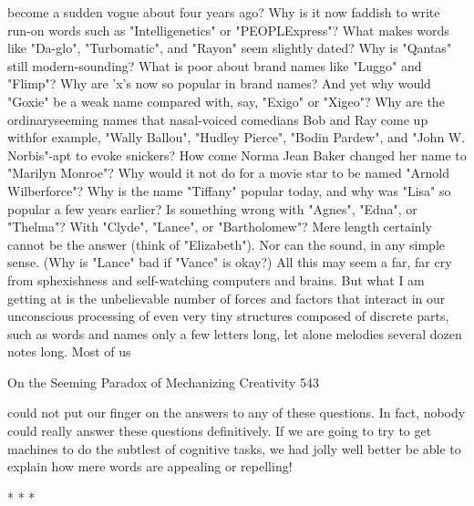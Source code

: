 become a sudden vogue about four years ago?
        Why is it now faddish to write run-on words such as "Intelligenetics" or
"PEOPLExpress"? What makes words like "Da-glo", "Turbomatic", and "Rayon"
seem slightly dated? Why is "Qantas" still modern-sounding? What is poor about
brand names like "Luggo" and "Flimp"? Why are 'x's now so popular in brand names?
And yet why would "Goxie" be a weak name compared with, say, "Exigo" or
"Xigeo"? Why are the ordinaryseeming names that nasal-voiced comedians Bob and
Ray come up withfor example, "Wally Ballou", "Hudley Pierce", "Bodin Pardew",
and "John W. Norbis"-apt to evoke snickers? How come Norma Jean Baker changed
her name to "Marilyn Monroe"? Why would it not do for a movie star to be named
"Arnold Wilberforce"? Why is the name "Tiffany" popular today, and why was "Lisa"
so popular a few years earlier? Is something wrong with "Agnes", "Edna", or
"Thelma"? With "Clyde", "Lance", or "Bartholomew"? Mere length certainly cannot
be the answer (think of "Elizabeth"). Nor can the sound, in any simple sense. (Why is
"Lance" bad if "Vance" is okay?)
        All this may seem a far, far cry from sphexishness and self-watching
computers and brains. But what I am getting at is the unbelievable number of forces
and factors that interact in our unconscious processing of even very tiny structures
composed of discrete parts, such as words and names only a few letters long, let alone
melodies several dozen notes long. Most of us




On the Seeming Paradox of Mechanizing Creativity                                    543

could not put our finger on the answers to any of these questions. In fact, nobody
could really answer these questions definitively. If we are going to try to get machines
to do the subtlest of cognitive tasks, we had jolly well better be able to explain how
mere words are appealing or repelling!

                                        *   *   *

